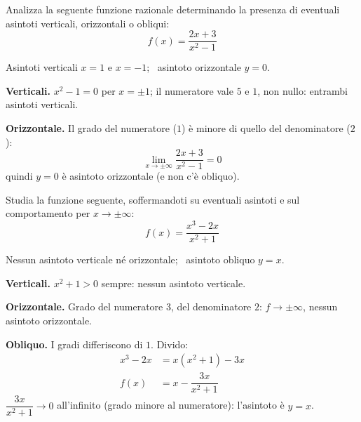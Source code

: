 
\begin{question}[ID=5.3, subtitle={Asintoti di $f(x)=(2x+3)/(x^2-1)$}, tags={continuità, asintoti}, difficulty=media]
Analizza la seguente funzione razionale determinando la presenza di eventuali asintoti verticali, orizzontali o obliqui:
\begin{equation*}
    f(x) = \frac{2x+3}{x^2-1}
\end{equation*}
\begin{solution}
Asintoti verticali $x=1$ e $x=-1$; \ asintoto orizzontale $y=0$.
\end{solution}
\begin{explanation}
\textbf{Verticali.} $x^2-1=0$ per $x=\pm1$; il numeratore vale $5$ e $1$, non nullo: entrambi asintoti verticali.

\textbf{Orizzontale.} Il grado del numeratore ($1$) è minore di quello del denominatore ($2$):
\[ \lim_{x\to\pm\infty}\dfrac{2x+3}{x^2-1}=0 \]
quindi $y=0$ è asintoto orizzontale (e non c'è obliquo).
\end{explanation}
\end{question}


\begin{question}[ID=5.4, subtitle={Asintoti di $f(x)=(x^3-2x)/(x^2+1)$}, tags={continuità, asintoti}, difficulty=media]
Studia la funzione seguente, soffermandoti su eventuali asintoti e sul comportamento per $x \to \pm\infty$:
\begin{equation*}
    f(x) = \frac{x^3 - 2x}{x^2+1}
\end{equation*}
\begin{solution}
Nessun asintoto verticale né orizzontale; \ asintoto obliquo $y=x$.
\end{solution}
\begin{explanation}
\textbf{Verticali.} $x^2+1>0$ sempre: nessun asintoto verticale.

\textbf{Orizzontale.} Grado del numeratore $3$, del denominatore $2$: $f\to\pm\infty$, nessun asintoto orizzontale.

\textbf{Obliquo.} I gradi differiscono di $1$. Divido:
\[\begin{aligned}
x^3-2x &= x(x^2+1)-3x\\
f(x) &= x-\dfrac{3x}{x^2+1}
\end{aligned}\]
$\dfrac{3x}{x^2+1}\to0$ all'infinito (grado minore al numeratore): l'asintoto è $y=x$.
\end{explanation}
\end{question}

